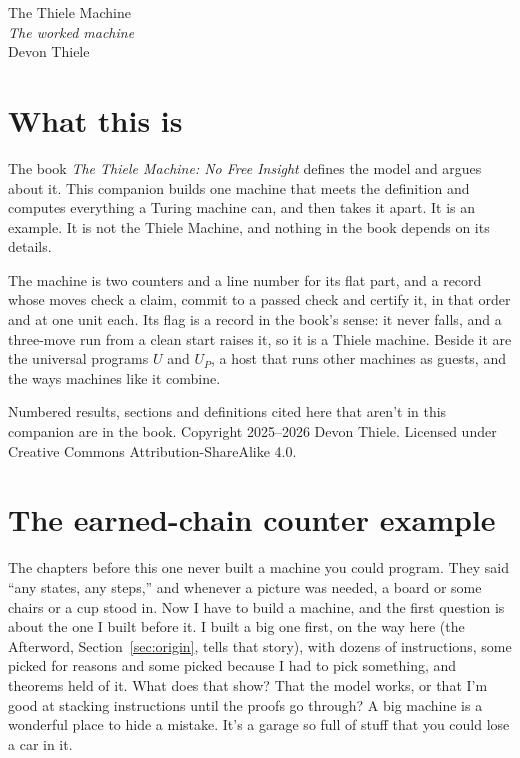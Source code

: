 \documentclass[11pt,twoside]{article}
\theoremstyle{thielethm}
\theoremstyle{thieledef}
\theoremstyle{thieledef}
\theoremstyle{thieledef}
\theoremstyle{thielethm}
\theoremstyle{thieleobs}
\theoremstyle{thielethm}
\begin{document}
\pagestyle{book}

\begin{center}
{\fontsize{28}{32}\selectfont The Thiele Machine}\\[6pt]
{\large\itshape The worked machine}\\[14pt]
Devon Thiele
\end{center}

\section*{What this is}

The book \textit{The Thiele Machine: No Free Insight} defines the model and argues about it. This
companion builds one machine that meets the definition and computes everything a Turing machine
can, and then takes it apart. It is an example. It is not the Thiele Machine, and nothing in the
book depends on its details.

The machine is two counters and a line number for its flat part, and a record whose moves check a
claim, commit to a passed check and certify it, in that order and at one unit each. Its flag is a
record in the book's sense: it never falls, and a three-move run from a clean start raises it, so
it is a Thiele machine. Beside it are the universal programs $U$ and $U_P$, a host that runs other
machines as guests, and the ways machines like it combine.

Numbered results, sections and definitions cited here that aren't in this companion are in the
book. Copyright 2025--2026 Devon Thiele. Licensed under Creative Commons Attribution-ShareAlike 4.0.

\tableofcontents
\clearpage

\section{The earned-chain counter example}
\label{sec:smallest}

The chapters before this one never built a machine you could program. They said ``any states, any steps,'' and whenever a
picture was needed, a board or some chairs or a cup stood in. Now I have to build a
machine, and the first question is about the one I built before it. I built a big
one first, on the way here (the Afterword, Section~\ref{sec:origin}, tells that story), with dozens of instructions,
some picked for reasons and some picked because I had to pick something, and theorems held of it.
What does that show? That the model works, or that I'm good at stacking instructions until the
proofs go through? A big machine is a wonderful place to hide a mistake. It's a garage so full
of stuff that you could lose a car in it.
\end{document}

